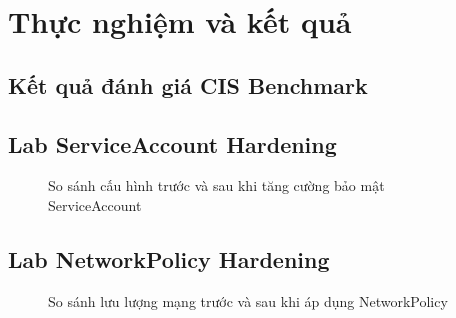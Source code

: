\chapter{Thực nghiệm và kết quả}
\label{chap:experiments}


\section{Kết quả đánh giá CIS Benchmark}
\label{sec:audit-results}


\section{Lab ServiceAccount Hardening}
\label{sec:sa-hardening}


\begin{figure}[htbp]
  \centering
  \caption{So sánh cấu hình trước và sau khi tăng cường bảo mật ServiceAccount}
  \label{fig:sa-hardening-before-after}
\end{figure}

\section{Lab NetworkPolicy Hardening}
\label{sec:networkpolicy-hardening}


\begin{figure}[htbp]
  \centering
  \caption{So sánh lưu lượng mạng trước và sau khi áp dụng NetworkPolicy}
  \label{fig:networkpolicy-before-after}
\end{figure}
